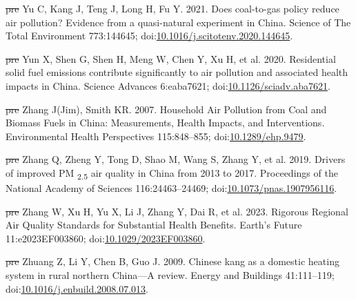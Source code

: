 \documentclass[
  letterpaper,
  DIV=11,
  numbers=noendperiod]{scrartcl}
\newlength{\cslhangindent}
\newenvironment{CSLReferences}[2] %
 {\begin{list}{}{%
  \setlength{\itemindent}{0pt} %
  \setlength{\leftmargin}{0pt} %
  \setlength{\parsep}{0pt} %
  \ifodd #1
   \setlength{\leftmargin}{\cslhangindent} %
   \setlength{\itemindent}{-1\cslhangindent} %
  \fi
  \setlength{\itemsep}{#2\baselineskip}}} %
 {\end{list}} %
\providecommand{\DIFdel}[1]{{\protect\color{red}\sout{#1}}}                      %
\providecommand{\DIFaddbegin}{} %
\providecommand{\DIFaddend}{} %
\providecommand{\DIFdelbegin}{} %
\providecommand{\DIFdelend}{} %
\newcommand{\DIFscaledelfig}{0.5}
\newlength{\DIFdelgraphicswidth} %
\newlength{\DIFdelgraphicsheight} %
\newcommand{\DIFaddincludegraphics}[2][]{{\color{blue}\fbox{\DIFOincludegraphics[#1]{#2}}}} %
\newcommand{\DIFdelincludegraphics}[2][]{%
\sbox{\DIFdelgraphicsbox}{\DIFOincludegraphics[#1]{#2}}%
\settoboxwidth{\DIFdelgraphicswidth}{\DIFdelgraphicsbox} %
\settoboxtotalheight{\DIFdelgraphicsheight}{\DIFdelgraphicsbox} %
\scalebox{\DIFscaledelfig}{%
\parbox[b]{\DIFdelgraphicswidth}{\usebox{\DIFdelgraphicsbox}\\[-\baselineskip] \rule{\DIFdelgraphicswidth}{0em}}\llap{\resizebox{\DIFdelgraphicswidth}{\DIFdelgraphicsheight}{%
\setlength{\unitlength}{\DIFdelgraphicswidth}%
\begin{picture}(1,1)%
\thicklines\linethickness{2pt} %
{\color[rgb]{1,0,0}\put(0,0){\framebox(1,1){}}}%
{\color[rgb]{1,0,0}\put(0,0){\line( 1,1){1}}}%
{\color[rgb]{1,0,0}\put(0,1){\line(1,-1){1}}}%
\end{picture}%
}\hspace*{3pt}}} %
} %
\DeclareRobustCommand{\DIFaddbegin}{\DIFOaddbegin \let\includegraphics\DIFaddincludegraphics} %
\DeclareRobustCommand{\DIFaddend}{\DIFOaddend \let\includegraphics\DIFOincludegraphics} %
\DeclareRobustCommand{\DIFdelbegin}{\DIFOdelbegin \let\includegraphics\DIFdelincludegraphics} %
\DeclareRobustCommand{\DIFdelend}{\DIFOaddend \let\includegraphics\DIFOincludegraphics} %
\begin{document}
\begin{CSLReferences}{1}{1}
\DIFdelbegin %
\DIFdel{pre}%
\DIFdelend \DIFaddbegin {}
\DIFaddend Yu C, Kang J, Teng J, Long H, Fu Y. 2021. Does coal-to-gas policy reduce
air pollution? {Evidence} from a quasi-natural experiment in {China}.
Science of The Total Environment 773:144645;
doi:\href{https://doi.org/10.1016/j.scitotenv.2020.144645}{10.1016/j.scitotenv.2020.144645}.

\DIFdelbegin %
\DIFdel{pre}%
\DIFdelend \DIFaddbegin {}
\DIFaddend Yun X, Shen G, Shen H, Meng W, Chen Y, Xu H, et al. 2020. Residential
solid fuel emissions contribute significantly to air pollution and
associated health impacts in {China}. Science Advances 6:eaba7621;
doi:\href{https://doi.org/10.1126/sciadv.aba7621}{10.1126/sciadv.aba7621}.

\DIFdelbegin %
\DIFdel{pre}%
\DIFdelend \DIFaddbegin {}
\DIFaddend Zhang J(Jim), Smith KR. 2007. Household {Air Pollution} from {Coal} and
{Biomass Fuels} in {China}: {Measurements}, {Health Impacts}, and
{Interventions}. Environmental Health Perspectives 115:848--855;
doi:\href{https://doi.org/10.1289/ehp.9479}{10.1289/ehp.9479}.

\DIFdelbegin %
\DIFdel{pre}%
\DIFdelend \DIFaddbegin {}
\DIFaddend Zhang Q, Zheng Y, Tong D, Shao M, Wang S, Zhang Y, et al. 2019. Drivers
of improved {PM} {\textsubscript{2.5}} air quality in {China} from 2013
to 2017. Proceedings of the National Academy of Sciences
116:24463--24469;
doi:\href{https://doi.org/10.1073/pnas.1907956116}{10.1073/pnas.1907956116}.

\DIFdelbegin %
\DIFdel{pre}%
\DIFdelend \DIFaddbegin {}
\DIFaddend Zhang W, Xu H, Yu X, Li J, Zhang Y, Dai R, et al. 2023. Rigorous
{Regional Air Quality Standards} for {Substantial Health Benefits}.
Earth's Future 11:e2023EF003860;
doi:\href{https://doi.org/10.1029/2023EF003860}{10.1029/2023EF003860}.

\DIFdelbegin %
\DIFdel{pre}%
\DIFdelend \DIFaddbegin {}
\DIFaddend Zhuang Z, Li Y, Chen B, Guo J. 2009. Chinese kang as a domestic heating
system in rural northern {China}---{A} review. Energy and Buildings
41:111--119;
doi:\href{https://doi.org/10.1016/j.enbuild.2008.07.013}{10.1016/j.enbuild.2008.07.013}.


\end{CSLReferences}
\end{document}
